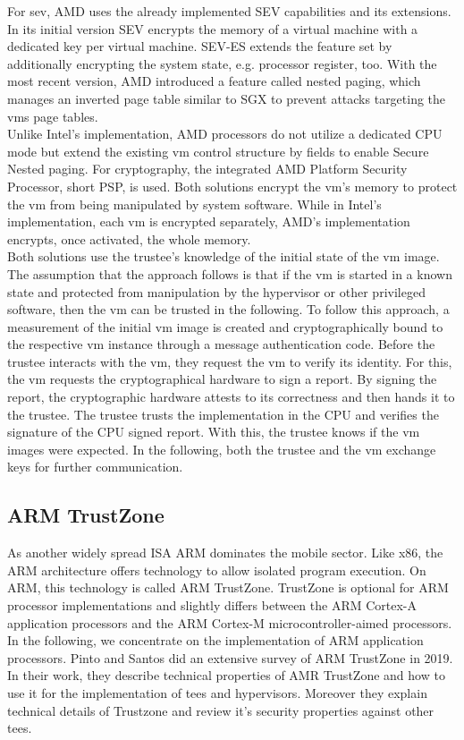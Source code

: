 For \gls{sev}, AMD uses the already implemented SEV capabilities and its
extensions. In its initial version SEV encrypts the memory of a virtual machine
with a dedicated key per virtual machine. SEV-ES extends the feature set by
additionally encrypting the system state, e.g. processor register, too. With the
most recent version, AMD introduced a feature called nested paging, which
manages an inverted page table similar to SGX to prevent attacks targeting the
\gls{vm}s page tables.\\

Unlike Intel's implementation, AMD processors do not utilize a dedicated CPU
mode but extend the existing \gls{vm} control structure by fields to enable
Secure Nested paging. For cryptography, the integrated AMD Platform Security
Processor, short PSP, is used. Both solutions encrypt the \gls{vm}'s memory to
protect the \gls{vm} from being manipulated by system software. While in Intel's
implementation, each \gls{vm} is encrypted separately, AMD's implementation
encrypts, once activated, the whole memory.\\

Both solutions use the trustee's knowledge of the initial state of the \gls{vm}
image. The assumption that the approach follows is that if the \gls{vm} is
started in a known state and protected from manipulation by the hypervisor or
other privileged software, then the \gls{vm} can be trusted in the following. To
follow this approach, a measurement of the initial \gls{vm} image is created and
cryptographically bound to the respective \gls{vm} instance through a message
authentication code. Before the trustee interacts with the \gls{vm}, they
request the \gls{vm} to verify its identity. For this, the \gls{vm} requests the
cryptographical hardware to sign a report. By signing the report, the
cryptographic hardware attests to its correctness and then hands it to the
trustee. The trustee trusts the implementation in the CPU and verifies the
signature of the CPU signed report. With this, the trustee knows if the \gls{vm}
images were expected. In the following, both the trustee and the \gls{vm}
exchange keys for further communication.\\

\subsection{ARM TrustZone}
\label{sec:20:trustzone}
As another widely spread ISA ARM dominates the mobile sector. Like x86, the ARM
architecture offers technology to allow isolated program execution. On ARM, this
technology is called ARM TrustZone. TrustZone is optional for ARM processor
implementations and slightly differs between the ARM Cortex-A application
processors and the ARM Cortex-M microcontroller-aimed processors. In the
following, we concentrate on the implementation of ARM application
processors. Pinto and Santos did an extensive survey of ARM TrustZone in 2019.
In their work, they describe technical properties of AMR TrustZone and how to
use it for the implementation of \glspl{tee} and hypervisors. Moreover they
explain technical details of Trustzone and review it's security properties
against other \glspl{tee}.\cite{pinto_demystifying_2019}\\

